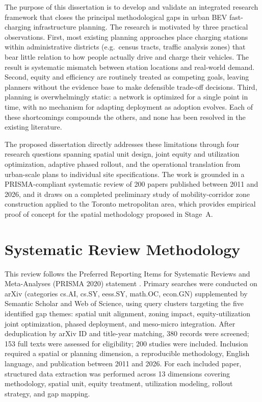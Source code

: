 \documentclass[12pt,letterpaper]{article}
\begin{document}
The purpose of this dissertation is to develop and validate an integrated
research framework that closes the principal methodological gaps in urban
BEV fast-charging infrastructure planning.  The research is motivated by
three practical observations.  First, most existing planning approaches
place charging stations within administrative districts (e.g.\ census
tracts, traffic analysis zones) that bear little relation to how people
actually drive and charge their vehicles.  The result is systematic
mismatch between station locations and real-world demand.  Second, equity
and efficiency are routinely treated as competing goals, leaving planners
without the evidence base to make defensible trade-off decisions.  Third,
planning is overwhelmingly static: a network is optimized for a single
point in time, with no mechanism for adapting deployment as adoption
evolves.  Each of these shortcomings compounds the others, and none has
been resolved in the existing literature.

The proposed dissertation directly addresses these limitations through
four research questions spanning spatial unit design, joint equity and
utilization optimization, adaptive phased rollout, and the operational
translation from urban-scale plans to individual site specifications.  The
work is grounded in a PRISMA-compliant systematic review of 200 papers
published between 2011 and 2026, and it draws on a completed preliminary
study of mobility-corridor zone construction applied to the Toronto
metropolitan area, which provides empirical proof of concept for the
spatial methodology proposed in Stage~A.

\section{Systematic Review Methodology}

This review follows the Preferred Reporting Items for Systematic Reviews
and Meta-Analyses (PRISMA 2020) statement \citep{page2021}.  Primary
searches were conducted on arXiv (categories cs.AI, cs.SY, eess.SY,
math.OC, econ.GN) supplemented by Semantic Scholar and Web of Science,
using query clusters targeting the five identified gap themes: spatial
unit alignment, zoning impact, equity-utilization joint optimization,
phased deployment, and meso-micro integration.  After deduplication by
arXiv ID and title-year matching, 380 records were screened; 153 full
texts were assessed for eligibility; 200 studies were included.
Inclusion required a spatial or planning dimension, a reproducible
methodology, English language, and publication between 2011 and 2026.
For each included paper, structured data extraction was performed across
13 dimensions covering methodology, spatial unit, equity treatment,
utilization modeling, rollout strategy, and gap mapping.
\end{document}
